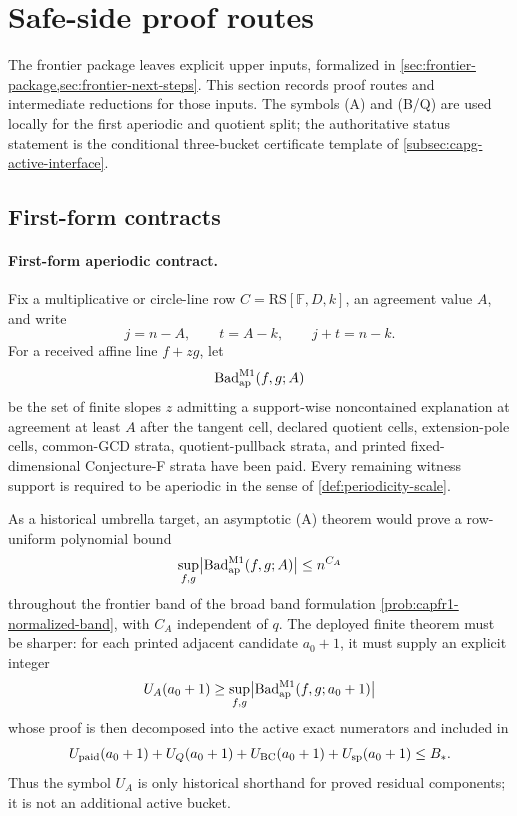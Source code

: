 \documentclass[11pt]{article}
\theoremstyle{definition}
\theoremstyle{remark}
\newcommand{\F}{\mathbb{F}}
\newcommand{\RS}{\mathrm{RS}}
\providecommand{\Bad}{\operatorname{Bad}}
\begin{document}
\section{Safe-side proof routes}\label{sec:capfaq-strategies}

The frontier package leaves explicit upper inputs, formalized in \cref{sec:frontier-package,sec:frontier-next-steps}.  This section records proof routes and intermediate reductions for those inputs.  The symbols \textup{(A)} and \textup{(B/Q)} are used locally for the first aperiodic and quotient split; the authoritative status statement is the conditional three-bucket certificate template of \cref{subsec:capg-active-interface}.

\subsection{First-form contracts}\label{subsec:capfaq-contracts}

\paragraph{First-form aperiodic contract.}
Fix a multiplicative or circle-line row $C=\RS[\F,D,k]$, an agreement value $A$, and write
\[
        j=n-A,
        \qquad t=A-k,
        \qquad j+t=n-k .
\]
For a received affine line $f+zg$, let
\[
        \Bad_{\rm ap}^{\rm M1}(f,g;A)
\]
be the set of finite slopes $z$ admitting a support-wise noncontained explanation at agreement at least $A$ after the tangent cell, declared quotient cells, extension-pole cells, common-GCD strata, quotient-pullback strata, and printed fixed-dimensional Conjecture-F strata have been paid.  Every remaining witness support is required to be aperiodic in the sense of \cref{def:periodicity-scale}.

As a historical umbrella target, an asymptotic \textup{(A)} theorem would prove a row-uniform polynomial bound
\[
        \sup_{f,g}\bigl|\Bad_{\rm ap}^{\rm M1}(f,g;A)\bigr|
        \le n^{C_A}
\]
throughout the frontier band of the broad band formulation \cref{prob:capfr1-normalized-band}, with $C_A$ independent of $q$.  The deployed finite theorem must be sharper: for each printed adjacent candidate $a_0+1$, it must supply an explicit integer
\[
        U_A(a_0+1)
        \ge
        \sup_{f,g}\bigl|\Bad_{\rm ap}^{\rm M1}(f,g;a_0+1)\bigr|
\]
whose proof is then decomposed into the active exact numerators and included in
\[
        U_{\rm paid}(a_0+1)+U_Q(a_0+1)+U_{\rm BC}(a_0+1)+U_{\rm sp}(a_0+1)\le B_* .
\]
Thus the symbol $U_A$ is only historical shorthand for proved residual components; it is not an additional active bucket.
\end{document}
